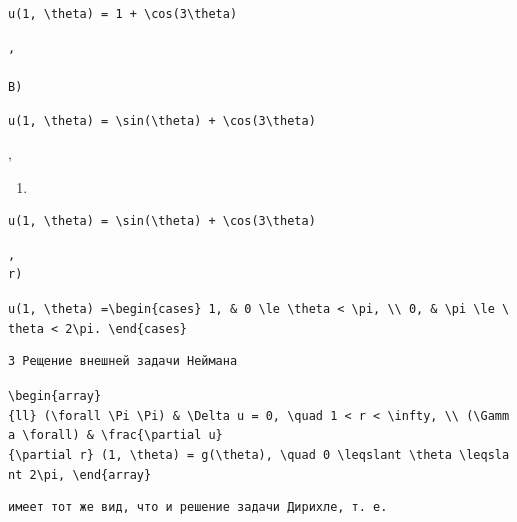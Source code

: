 \documentclass[
  ukrainian,
]{article}
\providecommand{\tightlist}{%
  \setlength{\itemsep}{0pt}\setlength{\parskip}{0pt}}
\begin{document}
\begin{verbatim}
u(1, \theta) = 1 + \cos(3\theta)
\end{verbatim}

\begin{verbatim}
,

B)
\end{verbatim}

\texttt{u(1,\ \textbackslash{}theta)\ =\ \textbackslash{}sin(\textbackslash{}theta)\ +\ \textbackslash{}cos(3\textbackslash{}theta)}

,

\begin{enumerate}
\def\labelenumi{\Alph{enumi})}
\setcounter{enumi}{1}
\tightlist
\item
\end{enumerate}

\begin{verbatim}
u(1, \theta) = \sin(\theta) + \cos(3\theta)
\end{verbatim}

\begin{verbatim}
,  
r)
\end{verbatim}

\texttt{u(1,\ \textbackslash{}theta)\ =\textbackslash{}begin\{cases\}\ 1,\ \&\ 0\ \textbackslash{}le\ \textbackslash{}theta\ \textless{}\ \textbackslash{}pi,\ \textbackslash{}\textbackslash{}\ 0,\ \&\ \textbackslash{}pi\ \textbackslash{}le\ \textbackslash{}theta\ \textless{}\ 2\textbackslash{}pi.\ \textbackslash{}end\{cases\}}

\begin{verbatim}
3 Рещение внешней задачи Неймана
\end{verbatim}

\texttt{\textbackslash{}begin\{array\}\{ll\}\ (\textbackslash{}forall\ \textbackslash{}Pi\ \textbackslash{}Pi)\ \&\ \textbackslash{}Delta\ u\ =\ 0,\ \textbackslash{}quad\ 1\ \textless{}\ r\ \textless{}\ \textbackslash{}infty,\ \textbackslash{}\textbackslash{}\ (\textbackslash{}Gamma\ \textbackslash{}forall)\ \&\ \textbackslash{}frac\{\textbackslash{}partial\ u\}\{\textbackslash{}partial\ r\}\ (1,\ \textbackslash{}theta)\ =\ g(\textbackslash{}theta),\ \textbackslash{}quad\ 0\ \textbackslash{}leqslant\ \textbackslash{}theta\ \textbackslash{}leqslant\ 2\textbackslash{}pi,\ \textbackslash{}end\{array\}}

\begin{verbatim}
имеет тот же вид, что и решение задачи Дирихле, т. е.
\end{verbatim}
\end{document}
